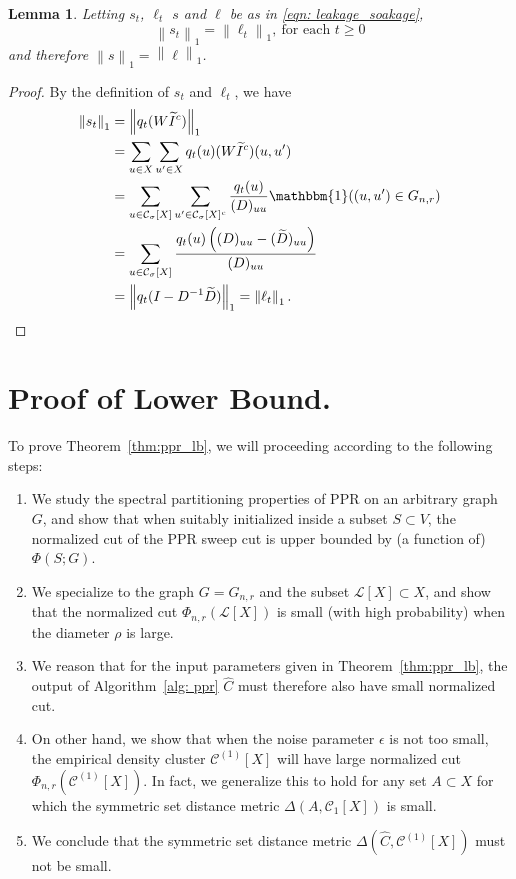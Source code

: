 \documentclass[11pt,twoside]{article}
\newtheorem{lemma}{Lemma}
\theoremstyle{definition}
\newcommand{\norm}[1]{\left\lVert#1\right\rVert}
\newcommand{\1}{\mathbbm{1}}
\newcommand{\Xbf}{X}
\newcommand{\Wbf}{W}
\newcommand{\Dbf}{D}
\newcommand{\Ibf}[1]{I_{#1}}
\newcommand{\Cset}{\mathcal{C}}
\newcommand{\Csig}{\Cset_{\sigma}}
\newcommand{\Cest}{\widehat{C}}
\begin{document}
\begin{lemma}
	\label{lem: total_leakage_equal_total_soakage}
	Letting $s_t$, $\ell_t$ $s$ and $\ell$ be as in \eqref{eqn: leakage_soakage},
	\begin{equation*}
	\norm{s_t}_1 = \norm{\ell_t}_1,~ \textrm{for each $t \geq 0$}
	\end{equation*}
	and therefore $\norm{s}_1 = \norm{\ell}_1$. 
\end{lemma}
\begin{proof}
	By the definition of $s_t$ and $\ell_t$, we have
	\begin{align*}
	\norm{s_t}_1 & = \norm{q_t (\Wbf \widetilde{I}^c)}_1 \\
	& = \sum_{u \in \Xbf} \sum_{u' \in \Xbf} q_t(u) (\Wbf \widetilde{I}^c)(u, u') \\
	& = \sum_{u \in\Csig[\Xbf]} \sum_{u' \in \Csig[\Xbf]^c} \frac{q_t(u)}{(\Dbf)_{uu}} \1((u,u') \in G_{n,r}) \\
	& = \sum_{u \in \Csig[\Xbf]} \frac{q_t(u) \left((\Dbf)_{uu} - (\widetilde{\Dbf})_{uu} \right)}{(\Dbf)_{uu}} \\
	& = \norm{q_t (\Ibf{} - \Dbf^{-1} \widetilde{\Dbf})}_1 = \norm{\ell_t}_1.
	\end{align*}
\end{proof}

\section{Proof of Lower Bound.}

To prove Theorem~\ref{thm:ppr_lb}, we will proceeding according to the following steps:
\begin{enumerate}
	\item We study the spectral partitioning properties of PPR on an arbitrary graph $G$, and show that when suitably initialized inside a subset $S \subset V$, the normalized cut of the PPR sweep cut is upper bounded by (a function of) $\Phi(S;G)$. 
	\item We specialize to the graph $G = G_{n,r}$ and the subset $\mathcal{L}[\Xbf] \subset \Xbf$, and show that the normalized cut $\Phi_{n,r}(\mathcal{L}[\Xbf])$ is small (with high probability) when the diameter $\rho$ is large.
	\item We reason that for the input parameters given in Theorem~\ref{thm:ppr_lb}, the output of Algorithm~\ref{alg: ppr} $\Cest$ must therefore also have small normalized cut.
	\item On other hand, we show that when the noise parameter $\epsilon$ is not too small, the empirical density cluster $\Cset^{(1)}[\Xbf]$ will have large normalized cut $\Phi_{n,r}(\Cset^{(1)}[\Xbf])$. In fact, we generalize this to hold for any set $A \subset \Xbf$ for which the symmetric set distance metric $\Delta(A,\Cset_1[\Xbf])$ is small.
	\item We conclude that the symmetric set distance metric $\Delta(\Cest,\Cset^{(1)}[\Xbf])$ must not be small.
\end{enumerate}
\end{document}
